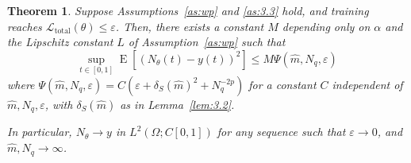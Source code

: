 \documentclass[11pt, a4paper]{article}
\theoremstyle{theoremstyle}
\newtheorem{theorem}{Theorem}[section]
\theoremstyle{definitionstyle}
\DeclareMathOperator{\EE}{\mathrm E}
\begin{document}
\begin{theorem}
    Suppose Assumptions~\ref{as:wp} and \ref{as:3.3} hold, and training reaches \( \mathcal L_{\mathrm{total}}(\theta) \leq \varepsilon \). Then, there exists a constant \( M \) depending only on \(\alpha\) and the Lipschitz constant \(L\) of Assumption~\ref{as:wp} such that
    \begin{equation}
        \sup_{t \in [0,1]} \EE \left [ (N_\theta(t) - y(t))^2 \right ] \leq M\Psi(\hat m, N_q, \varepsilon) 
    \end{equation}
    where \(\Psi(\hat m, N_q, \varepsilon) = C(\varepsilon + \delta_S(\hat m)^2 + N_q^{-2p})\) for a constant \(C\) independent of \(\hat m, N_q, \varepsilon\), with \(\delta_S(\hat m)\) as in Lemma~\ref{lem:3.2}.

    In particular, \(N_\theta \to y\) in \(L^2(\Omega; C[0,1])\) for any sequence such that \(\varepsilon \to 0\), and \(\hat m, N_q \to \infty\).
\end{theorem}
\end{document}
